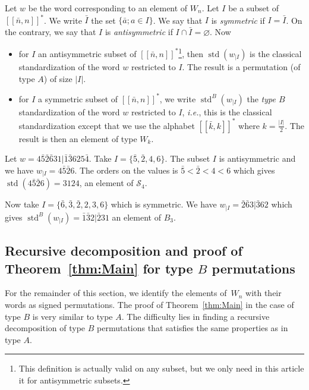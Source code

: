 \documentclass[ALCO,Unicode]{cedram}
\theoremstyle{definition}
\newcommand{\Sym}[1]{\mathcal{S}_{#1}}
\DeclareMathOperator{\std}{std}
\newcommand{\rest}[2]{#1_{|#2}}
\newcommand{\Bsetnn}{[\![\bar{n},n ]\!]^*}
\newcommand{\Bsetkk}{[\![\bar{k},k ]\!]^*}
\newcommand{\Bstd}{\std^{B}}
\begin{document}
\begin{defi}\label{def:Standard}
Let $w$ be the word corresponding to an element of $W_n$. Let $I$ be a subset of $\Bsetnn$. We write $\bar{I}$ the set $\lbrace \bar a; a \in I \rbrace$. We say that $I$ is \emph{symmetric} if $I = \bar{I}$. On the contrary, we say that $I$ is {\em antisymmetric} if $I \cap \bar{I} = \varnothing$. Now
\begin{itemize}
\item for $I$ an antisymmetric subset of $\Bsetnn$\footnote{This definition is actually valid on any subset, but we only need in this article  it for antisymmetric subsets.}, then $\std(\rest{w}{I})$ is the classical standardization of the word $w$ restricted to $I$. The result is a permutation (of type $A$) of size $|I|$.
\item for $I$ a symmetric subset of $\Bsetnn$, we write $\Bstd(\rest{w}{I})$ the \emph{type $B$} standardization of the word $w$ restricted to $I$, \emph{i.e.}, this is the classical standardization except that we use the alphabet $\Bsetkk$ where $k = \frac{|I|}{2}$. The result is then an element of type $W_k$.
\end{itemize}
\end{defi}

\begin{ex}
\label{ex:restrition}
Let $w = 4 \bar{5} \bar{2} \bar{6} 3 1 | \bar{1} \bar{3} 6 2 5 \bar{4}$. Take $I = \lbrace \bar{5}, \bar{2}, 4, 6 \rbrace$. The subset $I$ is antisymmetric and we have $\rest{w}{I} = 4 \bar{5} \bar{2} 6$. The orders on the values is $\bar{5} < \bar{2} < 4 < 6$ which gives $\std(4 \bar{5} \bar{2} 6) = 3 1 2 4$, an element of $\Sym{4}$.

Now take $I = \lbrace \bar{6}, \bar{3}, \bar{2}, 2, 3, 6 \rbrace$ which is symmetric. We have $\rest{w}{I} = \bar{2} \bar{6} 3 | \bar{3} 6 2$ which gives $\Bstd(\rest{w}{I}) = \bar{1} \bar{3} 2 | \bar{2} 3 1$ an element of $B_3$. 
\end{ex}


\subsection{Recursive decomposition and proof of Theorem~\ref{thm:Main} for type \texorpdfstring{$B$}{B} permutations} For the remainder of this section, we identify the elements of~$W_n$ with their words as signed permutations.  The proof of Theorem~\ref{thm:Main} in the case of type $B$ is very similar to type $A$. The difficulty lies in finding a recursive decomposition of type $B$ permutations that satisfies the same properties as in type $A$.
\end{document}
